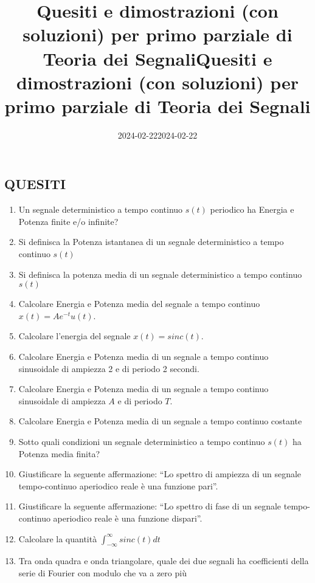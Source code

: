\documentclass[
  paper=a4,
  ,captions=tableheading
]{scrartcl}
\title{Quesiti e dimostrazioni (con soluzioni) per primo parziale di
Teoria dei Segnali}
\author{}
\date{2024-02-22}
\title{Quesiti e dimostrazioni (con soluzioni) per primo parziale di
Teoria dei Segnali}
\author{}
\date{2024-02-22}
\providecommand{\tightlist}{%
  \setlength{\itemsep}{0pt}\setlength{\parskip}{0pt}}
\begin{document}




\subsection{QUESITI}\label{quesiti}

\begin{enumerate}
\def\labelenumi{\arabic{enumi}.}
\tightlist
\item
  Un segnale deterministico a tempo continuo \(s(t)\) periodico ha
  Energia e Potenza finite e/o infinite?
\item
  Si definisca la Potenza istantanea di un segnale deterministico a
  tempo continuo \(s(t)\)
\item
  Si definisca la potenza media di un segnale deterministico a tempo
  continuo \(s(t)\)
\item
  Calcolare Energia e Potenza media del segnale a tempo continuo
  \(x(t) = Ae ^{-t} u(t)\).
\item
  Calcolare l'energia del segnale \(x(t) = sinc(t)\).
\item
  Calcolare Energia e Potenza media di un segnale a tempo continuo
  sinusoidale di ampiezza 2 e di periodo 2 secondi.
\item
  Calcolare Energia e Potenza media di un segnale a tempo continuo
  sinusoidale di ampiezza \(A\) e di periodo \(T\).
\item
  Calcolare Energia e Potenza media di un segnale a tempo continuo
  costante
\item
  Sotto quali condizioni un segnale deterministico a tempo continuo
  \(s(t)\) ha Potenza media finita?
\item
  Giustificare la seguente affermazione: ``Lo spettro di ampiezza di un
  segnale tempo-continuo aperiodico reale è una funzione pari''.
\item
  Giustificare la seguente affermazione: ``Lo spettro di fase di un
  segnale tempo-continuo aperiodico reale è una funzione dispari''.
\item
  Calcolare la quantità \(\int_{- \infty}^{\infty} sinc(t) dt\)
\item
  Tra onda quadra e onda triangolare, quale dei due segnali ha
  coefficienti della serie di Fourier con modulo che va a zero più

\end{enumerate}
\end{document}
